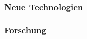 \chapter{}
\label{sec:overview}



\subsection{Neue Technologien}

	
\subsection{Forschung}

	
	
	



